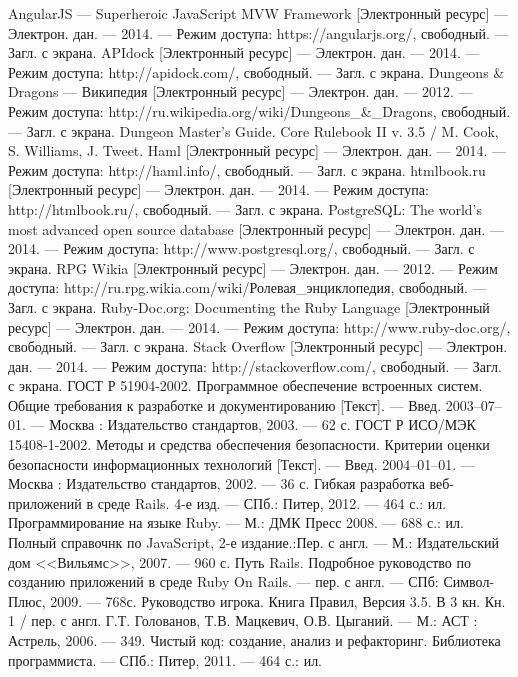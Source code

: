 \begin{thebibliography}{@@@@}
   AngularJS --- Superheroic JavaScript MVW Framework [Электронный ресурс] --- Электрон. дан. --- 2014. --- Режим доступа: https://angularjs.org/, свободный. --- Загл. с экрана.
   APIdock [Электронный ресурс] --- Электрон. дан. --- 2014. --- Режим доступа: http://apidock.com/, свободный. --- Загл. с экрана.
   Dungeons \& Dragons — Википедия [Электронный ресурс] --- Электрон. дан. --- 2012. --- Режим доступа: http://ru.wikipedia.org/wiki/Dungeons\_\&\_Dragons, свободный. --- Загл. с экрана.
   Dungeon Master's Guide. Core Rulebook II v. 3.5 / M. Cook, S. Williams, J. Tweet.
   Haml [Электронный ресурс] --- Электрон. дан. --- 2014. --- Режим доступа: http://haml.info/, свободный. --- Загл. с экрана.
   htmlbook.ru [Электронный ресурс] --- Электрон. дан. --- 2014. --- Режим доступа: http://htmlbook.ru/, свободный. --- Загл. с экрана.
   PostgreSQL: The world's most advanced open source database [Электронный ресурс] --- Электрон. дан. --- 2014. --- Режим доступа: http://www.postgresql.org/, свободный. --- Загл. с экрана.
   RPG Wikia [Электронный ресурс] --- Электрон. дан. --- 2012. --- Режим доступа: http://ru.rpg.wikia.com/wiki/Ролевая\_энциклопедия, свободный. --- Загл. с экрана.
   Ruby-Doc.org: Documenting the Ruby Language [Электронный ресурс] --- Электрон. дан. --- 2014. --- Режим доступа: http://www.ruby-doc.org/, свободный. --- Загл. с экрана.
   Stack Overflow [Электронный ресурс] --- Электрон. дан. --- 2014. --- Режим доступа: http://stackoverflow.com/, свободный. --- Загл. с экрана.
   ГОСТ Р 51904-2002. Программное обеспечение встроенных систем. Общие требования к разработке и документированию [Текст]. --- Введ. 2003–07–01. --- Москва : Издательство стандартов, 2003. --- 62 с. 
   ГОСТ Р ИСО/МЭК 15408-1-2002. Методы и средства обеспечения безопасности. Критерии оценки безопасности информационных технологий [Текст]. --- Введ. 2004–01–01. --- Москва : Издательство стандартов, 2002. --- 36 с.
   Гибкая разработка веб-приложений в среде Rails. 4-е изд. --- СПб.: Питер, 2012. --- 464 с.: ил.
   Программирование на языке Ruby. --- М.: ДМК Пресс 2008. --- 688 с.: ил.
   Полный справочнк по JavaScript, 2-е издание.:Пер. с англ. --- М.: Издательский дом <<Вильямс>>, 2007. --- 960 с.
   Путь Rails. Подробное руководство по созданию приложений в среде Ruby On Rails. --- пер. с англ. --- СПб: Символ-Плюс, 2009. --- 768с.
   Руководство игрока. Книга Правил, Версия 3.5. В 3 кн. Кн. 1 / пер. с англ. Г.Т. Голованов, Т.В. Мацкевич, О.В. Цыганий. — М.: АСТ : Астрель, 2006. — 349.
   Чистый код: создание, анализ и рефакторинг. Библиотека программиста. --- СПб.: Питер, 2011. --- 464 с.: ил.
\end{thebibliography}
